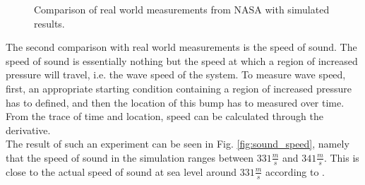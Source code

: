 \begin{figure}[!h]
    \caption{Comparison of real world measurements from NASA \cite{larson1963stratosphere} with simulated results.}
    \label{fig:cmp_nasa}
\end{figure}

The second comparison with real world measurements is the speed of sound.
The speed of sound is essentially nothing but the speed at which a region of increased pressure will travel, i.e. the wave speed of the system.
To measure wave speed, first, an appropriate starting condition containing a region of increased pressure has to defined, and then the location of this bump has to measured over time.
From the trace of time and location, speed can be calculated through the derivative.\\
The result of such an experiment can be seen in Fig. \ref{fig:sound_speed}, namely that the speed of sound in the simulation ranges between $331\frac{m}{s}$ and $341\frac{m}{s}$.
This is close to the actual speed of sound at sea level around $331\frac{m}{s}$ according to \cite{hardy1942velocity}.

